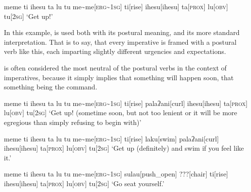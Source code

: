\ex
\begingl
\glpreamble meme ti ihesu ta lu tu
\endpreamble
me\textasciitilde me[\textsc{erg\textasciitilde1sg}]
ti[rise]
ihesu[ihesu]
ta[\textsc{prox}]
lu[\textsc{obv}]
tu[\textsc{2sg}]
\glft `Get up!'
\endgl
\xe

In this example,  is used both with its postural meaning, and its more standard interpretation.
That is to say, that every imperative is framed with a postural verb like this, each imparting slightly different urgencies and expectations.

 is often considered the most neutral of the postural verbs in the context of imperatives, because it simply implies that something will happen soon, that something being the command.


\ex
\begingl
\glpreamble meme ti ihesu ta lu tu
\endpreamble
me\textasciitilde me[\textsc{erg\textasciitilde1sg}]
ti[rise]
palaʔani[curl]
ihesu[ihesu]
ta[\textsc{prox}]
lu[\textsc{obv}]
tu[\textsc{2sg}]
\glft `Get up! (sometime soon, but not too lenient or it will be more egregious than simply refusing to begin with)'
\endgl
\xe

\ex
\begingl
\glpreamble meme ti ihesu ta lu tu
\endpreamble
me\textasciitilde me[\textsc{erg\textasciitilde1sg}]
ti[rise]
laku[swim]
palaʔani[curl]
ihesu[ihesu]
ta[\textsc{prox}]
lu[\textsc{obv}]
tu[\textsc{2sg}]
\glft `Get up (definitely) and swim if you feel like it.'
\endgl
\xe

\ex
\begingl
\glpreamble meme ti ihesu ta lu tu
\endpreamble
me\textasciitilde me[\textsc{erg\textasciitilde1sg}]
sulau[push\_open]
???[chair]
ti[rise]
ihesu[ihesu]
ta[\textsc{prox}]
lu[\textsc{obv}]
tu[\textsc{2sg}]
\glft `Go seat yourself.'
\endgl
\xe
